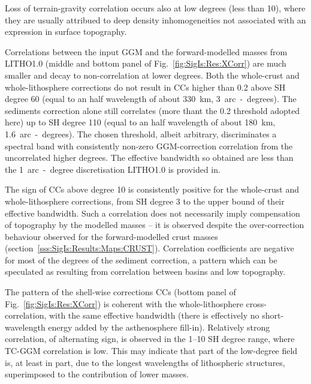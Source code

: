 Loss of terrain-gravity correlation occurs also at low degrees (less than \num{10}), where they are usually attribued to deep density inhomogeneities \parencite{Kaban2004} not associated with an expression in surface topography.

Correlations between the input GGM and the forward-modelled masses from {LITHO1.0} (middle and bottom panel of Fig.~\ref{fig:SigIs:Res:XCorr}) are much smaller and decay to non-correlation at lower degrees.
Both the whole-crust and whole-lithosphere corrections do not result in CCs higher than \num{0.2} above SH degree \num{60} (equal to an half wavelength of about \SI{330}{\kilo \metre}, \SI{3}{arc-degrees}).
The sediments correction alone still correlates (more thant the \num{0.2} threshold adopted here) up to SH degree \num{110} (equal to an half wavelength of about \SI{180}{\kilo \metre}, \SI{1.6}{arc-degrees}).
The chosen threshold, albeit arbitrary, discriminates a spectral band with consistently non-zero GGM-correction correlation from the uncorrelated higher degrees.
The effective bandwidth so obtained are less than the \SI{1}{arc-degree} discretisation LITHO1.0 is provided in.

The sign of CCs above degree \num{10} is consistently positive for the whole-crust and whole-lithosphere corrections, from SH degree \num{3} to the upper bound of their effective bandwidth.
Such a correlation does not necessarily imply compensation of topography by the modelled masses -- it is observed despite the over-correction behaviour observed for the forward-modelled crust masses (section~\ref{sss:SigIs:Results:Maps:CRUST}).
Correlation coefficients are negative for most of the degrees of the sediment correction, a pattern which can be speculated as resulting from correlation between basins and low topography.

The pattern of the shell-wise corrections CCs (bottom panel of Fig.~\ref{fig:SigIs:Res:XCorr}) is coherent with the whole-lithosphere cross-correlation, with the same effective bandwidth (there is effectively no short-wavelength energy added by the asthenosphere fill-in).
Relatively strong correlation, of alternating sign, is observed in the \num{1}--\num{10} SH degree range, where TC-GGM correlation is low.
This may indicate that part of the low-degree field is, at least in part, due to the longest wavelengths of lithospheric structures, superimposed to the contribution of lower masses.

